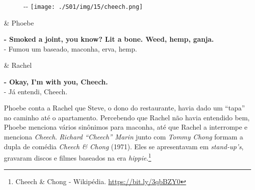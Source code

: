 \begin{figure}[!ht]
  \begin{adjustwidth}{-\oddsidemargin-1in}{-\rightmargin}
    \centering
    \texttt{[image: ./S01/img/15/cheech.png]}
  \end{adjustwidth}
\end{figure}

\begin{tcolorbox}[enhanced,center upper,
    drop fuzzy shadow southeast, boxrule=0.3pt,
    lower separated=false, breakable,
    colframe=black!30!dialogoBorder,colback=white]
\begin{minipage}[c]{0.16\linewidth}
   & \centering \scriptsize{Phoebe}
\end{minipage}
\hfill
\begin{minipage}[c]{0.8\linewidth}
  \textbf{- Smoked a joint, you know? Lit a bone. Weed, hemp, ganja.}\\
  - Fumou um baseado, maconha, erva, hemp.
\end{minipage}

\medskip
\begin{minipage}[c]{0.16\linewidth}
   & \centering \scriptsize{Rachel}
\end{minipage}
\hfill
\begin{minipage}[c]{0.8\linewidth}
  \textbf{- Okay, I'm with you, Cheech.}\\
  - Já entendi, Cheech.
\end{minipage}
\end{tcolorbox}

Phoebe conta a Rachel que Steve, o dono do restaurante, havia dado um
``tapa'' no caminho até o apartamento. Percebendo que Rachel não havia
entendido bem, Phoebe menciona vários sinônimos para maconha, até que
Rachel a interrompe e menciona \emph{Cheech}. \emph{Richard ``Cheech''
Marin} junto com \emph{Tommy Chong} formam a dupla de comédia
\emph{Cheech \& Chong} (1971). Eles se apresentavam em
\emph{stand-up's}, gravaram discos e filmes baseados na era
\emph{hippie}.\footnote{\sloppy Cheech \& Chong - Wikipédia. \url{https://bit.ly/3qbBZY0}}

